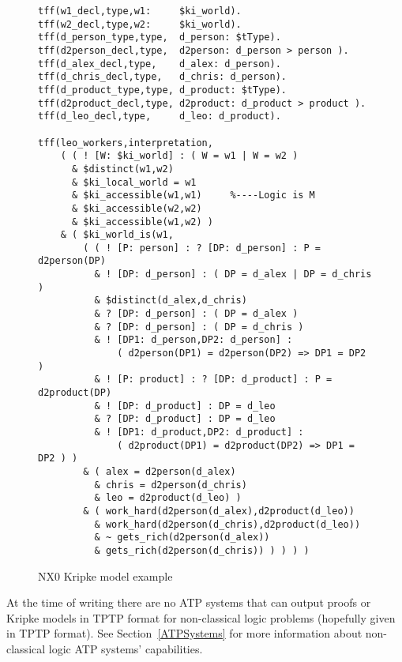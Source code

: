 \documentclass[runningheads]{llncs}
\begin{document}
\begin{figure}[h!]
\small
{}
% 
\begin{verbatim}
tff(w1_decl,type,w1:     $ki_world).
tff(w2_decl,type,w2:     $ki_world).
tff(d_person_type,type,  d_person: $tType).
tff(d2person_decl,type,  d2person: d_person > person ).
tff(d_alex_decl,type,    d_alex: d_person).
tff(d_chris_decl,type,   d_chris: d_person).
tff(d_product_type,type, d_product: $tType).
tff(d2product_decl,type, d2product: d_product > product ).
tff(d_leo_decl,type,     d_leo: d_product).

tff(leo_workers,interpretation,
    ( ( ! [W: $ki_world] : ( W = w1 | W = w2 )
      & $distinct(w1,w2)
      & $ki_local_world = w1
      & $ki_accessible(w1,w1)     %----Logic is M
      & $ki_accessible(w2,w2)
      & $ki_accessible(w1,w2) )
    & ( $ki_world_is(w1,
        ( ( ! [P: person] : ? [DP: d_person] : P = d2person(DP)
          & ! [DP: d_person] : ( DP = d_alex | DP = d_chris )
          & $distinct(d_alex,d_chris)
          & ? [DP: d_person] : ( DP = d_alex )
          & ? [DP: d_person] : ( DP = d_chris )
          & ! [DP1: d_person,DP2: d_person] : 
              ( d2person(DP1) = d2person(DP2) => DP1 = DP2 )
          & ! [P: product] : ? [DP: d_product] : P = d2product(DP)
          & ! [DP: d_product] : DP = d_leo
          & ? [DP: d_product] : DP = d_leo
          & ! [DP1: d_product,DP2: d_product] :
              ( d2product(DP1) = d2product(DP2) => DP1 = DP2 ) )
        & ( alex = d2person(d_alex)
          & chris = d2person(d_chris)
          & leo = d2product(d_leo) )
        & ( work_hard(d2person(d_alex),d2product(d_leo))
          & work_hard(d2person(d_chris),d2product(d_leo))
          & ~ gets_rich(d2person(d_alex))
          & gets_rich(d2person(d_chris)) ) ) ) )
\end{verbatim}
\caption{NX0 Kripke model example}
\label{NX0Kripke}
\end{figure}

At the time of writing there are no ATP systems that can output proofs or Kripke models
in TPTP format for non-classical logic problems (hopefully given in TPTP format).
See Section~\ref{ATPSystems} for more information about non-classical logic ATP systems' 
capabilities.
\end{document}
